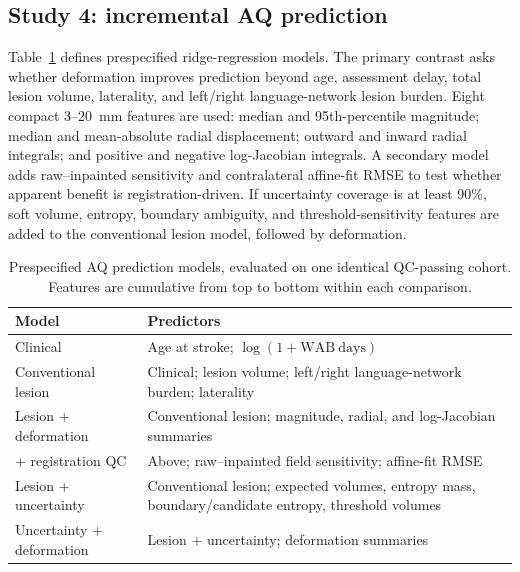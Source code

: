 \documentclass[runningheads]{llncs}
\begin{document}
\subsection{Study 4: incremental AQ prediction}
Table~\ref{tab:models} defines prespecified ridge-regression models. The primary
contrast asks whether deformation improves prediction beyond age, assessment
delay, total lesion volume, laterality, and left/right language-network lesion
burden. Eight compact 3--20~mm features are used: median and 95th-percentile
magnitude; median and mean-absolute radial displacement; outward and inward
radial integrals; and positive and negative log-Jacobian integrals. A secondary
model adds raw--inpainted sensitivity and contralateral affine-fit RMSE to test
whether apparent benefit is registration-driven. If uncertainty coverage is at
least 90\%, soft volume, entropy, boundary ambiguity, and threshold-sensitivity
features are added to the conventional lesion model, followed by deformation.

\begin{table}[t]
\caption{Prespecified AQ prediction models, evaluated on one identical
QC-passing cohort. Features are cumulative from top to bottom within each
comparison.}
\label{tab:models}
\centering
\scriptsize
\begin{tabularx}{\textwidth}{p{}X}
\toprule
Model & Predictors \\
\midrule
Clinical & Age at stroke; $\log(1+\mathrm{WAB\ days})$ \\
Conventional lesion & Clinical; lesion volume; left/right language-network burden; laterality \\
Lesion + deformation & Conventional lesion; magnitude, radial, and log-Jacobian summaries \\
+ registration QC & Above; raw--inpainted field sensitivity; affine-fit RMSE \\
Lesion + uncertainty & Conventional lesion; expected volumes, entropy mass, boundary/candidate entropy, threshold volumes \\
Uncertainty + deformation & Lesion + uncertainty; deformation summaries \\
\bottomrule
\end{tabularx}
\end{table}
\end{document}
